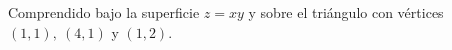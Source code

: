 \item Comprendido bajo la superficie $z = xy$ y sobre el triángulo con vértices $(1, 1), \ (4, 1)$ y $(1, 2)$.

